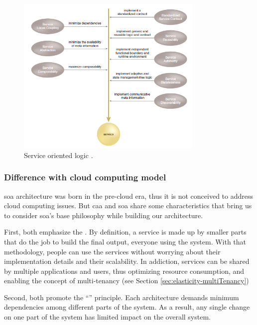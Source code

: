 \begin{figure}
	\centering{}
	\includegraphics[width=0.8\textwidth]{chapters/architecture/images/soa-characteristics.png}
	\caption[Service oriented logic]{Service oriented logic \cite{serviceCharacteristics}.}
	\label{img:architecture-soaRevisitation-characteristics}
\end{figure}

\subsubsection{Difference with cloud computing model}
\label{sec:architecture-soaRevisitation-compatibility}
\ac{soa} architecture was born in the pre-cloud era, thus it is not conceived to address cloud computing
issues. But \ac{caa} and \ac{soa} share some characteristics that bring us to consider \ac{soa}'s base
philosophy while building our architecture.

First, both emphasize the . By definition, a service is made up by smaller parts
that do the job to build the final output, everyone using the  system. With that methodology,
people can use the services without worrying about their implementation details and their scalability. In
addiction, services can be shared by multiple applications and users, thus optimizing resource consumption,
and enabling the concept of multi-tenancy (see Section \ref{sec:elasticity-multiTenancy})

Second, both promote the ``'' principle. Each architecture demands minimum
dependencies among different parts of the system. As a result, any single change on one part of the system
has limited impact on the overall system.


